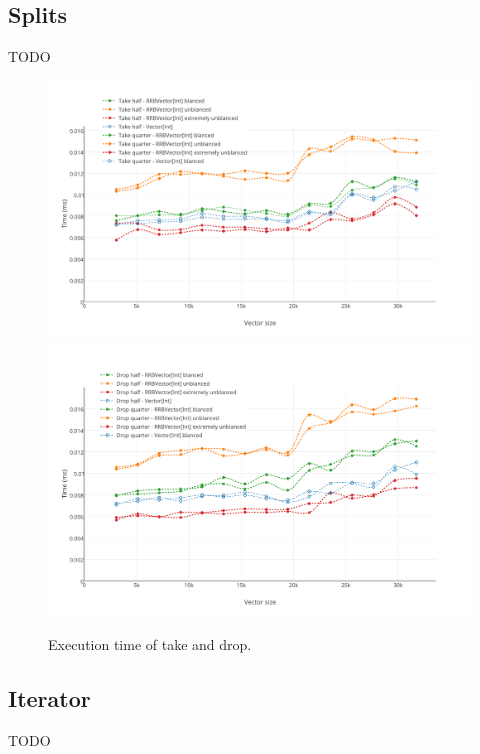 \subsection{Splits}
\color{red} TODO \color{black}

\begin{figure}[h!]
  \centering
  \includegraphics[width=\textwidth]{Benchmarks/Split_take_3.pdf}
  \includegraphics[width=\textwidth]{Benchmarks/Split_drop_3.pdf}
  \label{SplitsBenchmarks}
  \caption{Execution time of take and drop.}
\end{figure}


\subsection{Iterator}
\color{red} TODO \color{black}

